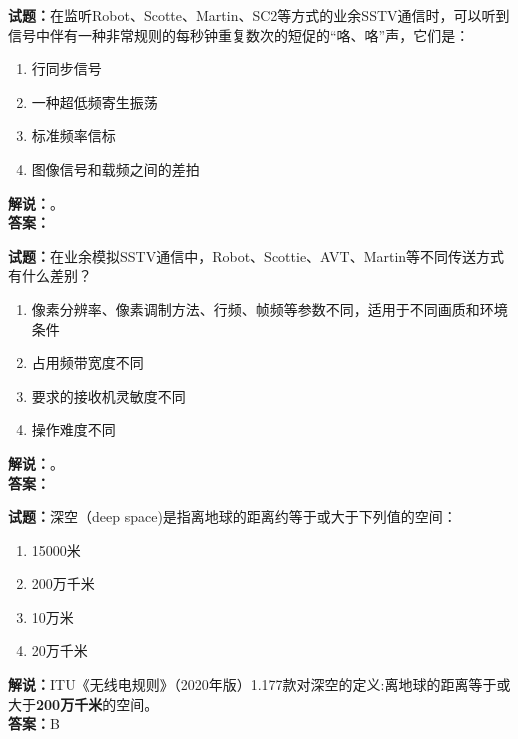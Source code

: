 \documentclass{ctexbook}
\begin{document}
\vspace{\baselineskip}

\noindent\textbf{试题：}在监听Robot、Scotte、Martin、SC2等方式的业余SSTV通信时，可以听到信号中伴有一种非常规则的每秒钟重复数次的短促的“咯、咯”声，它们是：
\begin{enumerate}[leftmargin=3em]
  \item 行同步信号
  \item 一种超低频寄生振荡
  \item 标准频率信标
  \item 图像信号和载频之间的差拍
\end{enumerate}
\noindent\textbf{解说：}\textbf{}。\\\noindent\textbf{答案：}

\vspace{\baselineskip}

\noindent\textbf{试题：}在业余模拟SSTV通信中，Robot、Scottie、AVT、Martin等不同传送方式有什么差别？
\begin{enumerate}[leftmargin=3em]
  \item 像素分辨率、像素调制方法、行频、帧频等参数不同，适用于不同画质和环境条件
  \item 占用频带宽度不同
  \item 要求的接收机灵敏度不同
  \item 操作难度不同
\end{enumerate}
\noindent\textbf{解说：}\textbf{}。\\\noindent\textbf{答案：}

\vspace{\baselineskip}

\noindent\textbf{试题：}深空（deep space)是指离地球的距离约等于或大于下列值的空间：
\begin{enumerate}[leftmargin=3em]
  \item 15000米
  \item 200万千米
  \item 10万米
  \item 20万千米
\end{enumerate}
\noindent\textbf{解说：}ITU《无线电规则》（2020年版）1.177款对深空的定义:离地球的距离等于或大于\textbf{200万千米}的空间。\\\noindent\textbf{答案：}B

\vspace{\baselineskip}
\end{document}
